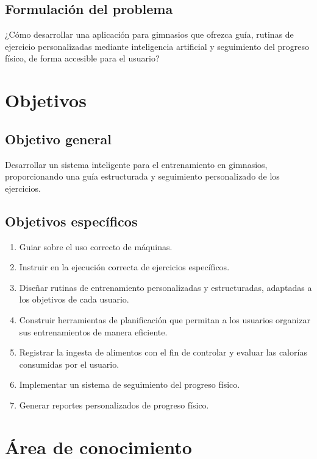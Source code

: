 \subsection{Formulación del problema}

¿Cómo desarrollar una aplicación para gimnasios que ofrezca guía, rutinas de
ejercicio personalizadas mediante inteligencia artificial y seguimiento del
progreso físico, de forma accesible para el usuario?

\section{Objetivos}
\label{sec:objetivos}

\subsection{Objetivo general}

Desarrollar un sistema inteligente para el entrenamiento en gimnasios,
proporcionando una guía estructurada y seguimiento personalizado de los
ejercicios.

\subsection{Objetivos específicos}
\label{subsec:objetivos-especificos}

\begin{enumerate}[label=\textbf{OE\arabic*.}, leftmargin=3.2em]
    \item Guiar sobre el uso correcto de máquinas.
    \item Instruir en la ejecución correcta de ejercicios específicos.
    \item Diseñar rutinas de entrenamiento personalizadas y estructuradas,
    adaptadas a los objetivos de cada usuario.
    \item Construir herramientas de planificación que permitan a los usuarios
    organizar sus entrenamientos de manera eficiente.
    \item Registrar la ingesta de alimentos con el fin de controlar y evaluar
    las calorías consumidas por el usuario.
    \item Implementar un sistema de seguimiento del progreso físico.
    \item Generar reportes personalizados de progreso físico.
\end{enumerate}

\section{Área de conocimiento}
\label{sec:area}

